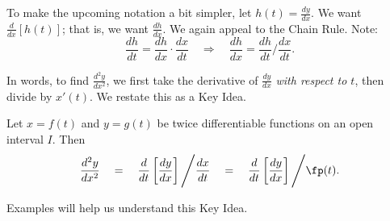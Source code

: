 To make the upcoming notation a bit simpler, let $h(t) = \frac{dy}{dx}$. We want $\frac{d}{dx}[h(t)]$; that is, we want $\frac{dh}{dx}$. We again appeal to the Chain Rule. Note:
$$\frac{dh}{dt} = \frac{dh}{dx}\cdot\frac{dx}{dt} \quad \Rightarrow \quad \frac{dh}{dx} = \frac{dh}{dt}\Bigg/\frac{dx}{dt}.$$

In words, to find $\frac{d^2y}{dx^2}$, we first take the derivative of $\frac{dy}{dx}$ \textit{with respect to $t$}, then divide by $x'(t)$. We restate this as a Key Idea.

{Let $x=f(t)$ and $y=g(t)$ be twice differentiable functions on an open interval $I$. Then 
$$\frac{d^2y}{dx^2}\quad = \quad\frac{d}{dt}\left[\frac{dy}{dx}\right]\Bigg/\frac{dx}{dt} \quad=\quad \frac{d}{dt}\left[\frac{dy}{dx}\right]\Bigg/\fp(t).$$ 
}

Examples will help us understand this Key Idea.\\

